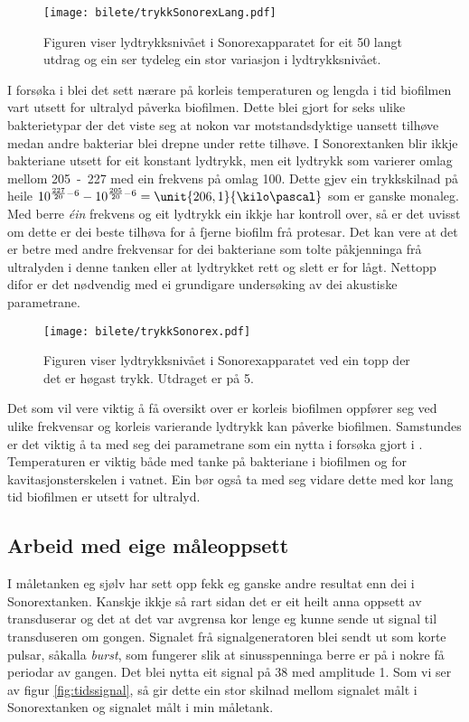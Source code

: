 \begin{figure}[htbp]
	\centering
	\texttt{[image: bilete/trykkSonorexLang.pdf]}
	\caption[Lydtrykksnivå i Sonorexapparat]{Figuren viser lydtrykksnivået i Sonorexapparatet for eit \unit{50}{\milli\second} langt utdrag og ein ser tydeleg ein stor variasjon i lydtrykksnivået.}
	\label{fig:trykksonorexlang}
\end{figure}

I forsøka i \cite{ultraprotese} blei det sett nærare på korleis temperaturen og lengda i tid biofilmen vart utsett for ultralyd påverka biofilmen. Dette blei gjort for seks ulike bakterietypar der det viste seg at nokon var motstandsdyktige uansett tilhøve medan andre bakteriar blei drepne under rette tilhøve. I Sonorextanken blir ikkje bakteriane utsett for eit konstant lydtrykk, men eit lydtrykk som varierer omlag mellom \unit{205 - 227}{\deci\bel} med ein frekvens på omlag \unit{100}{\hertz}. Dette gjev ein trykkskilnad på heile $10^{\frac{227}{20}-6} - 10^{\frac{205}{20}-6} = \unit{206,1}{\kilo\pascal}$ som er ganske monaleg. Med berre \emph{éin} frekvens og eit lydtrykk ein ikkje har kontroll over, så er det uvisst om dette er dei beste tilhøva for å fjerne biofilm frå protesar. Det kan vere at det er betre med andre frekvensar for dei bakteriane som tolte påkjenninga frå ultralyden i denne tanken eller at lydtrykket rett og slett er for lågt. Nettopp difor er det nødvendig med ei grundigare undersøking av dei akustiske parametrane.

\begin{figure}[htbp]
	\centering
	\texttt{[image: bilete/trykkSonorex.pdf]}
	\caption[Lydtrykksnivå i Sonorexapparat - lite utdrag]{Figuren viser lydtrykksnivået i Sonorexapparatet ved ein topp der det er høgast trykk. Utdraget er på \unit{5}{\milli\second}.}
	\label{fig:trykksonorex}
\end{figure}

Det som vil vere viktig å få oversikt over er korleis biofilmen oppfører seg ved ulike frekvensar og korleis varierande lydtrykk kan påverke biofilmen. Samstundes er det viktig å ta med seg dei parametrane som ein nytta i forsøka gjort i \cite{ultraprotese}. Temperaturen er viktig både med tanke på bakteriane i biofilmen og for kavitasjonsterskelen i vatnet. Ein bør også ta med seg vidare dette med kor lang tid biofilmen er utsett for ultralyd.

\subsection{Arbeid med eige måleoppsett}
I måletanken eg sjølv har sett opp fekk eg ganske andre resultat enn dei i Sonorextanken. Kanskje ikkje så rart sidan det er eit heilt anna oppsett av transduserar og det at det var avgrensa kor lenge eg kunne sende ut signal til transduseren om gongen. Signalet frå signalgeneratoren blei sendt ut som korte pulsar, såkalla \emph{burst}, som fungerer slik at sinusspenninga berre er på i nokre få periodar av gangen. Det blei nytta eit signal på \unit{38}{\kilo\hertz} med amplitude \unit{1}{\volt}. Som vi ser av figur \ref{fig:tidssignal}, så gir dette ein stor skilnad mellom signalet målt i Sonorextanken og signalet målt i min måletank.

